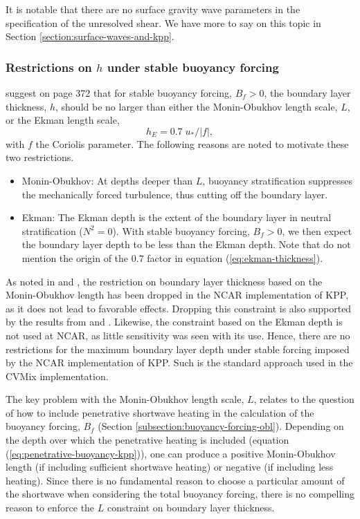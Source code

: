 It is notable that there are no surface gravity wave parameters in the
specification of the unresolved shear.  We have more to say on this
topic in Section \ref{section:surface-waves-and-kpp}. 


\subsubsection{Restrictions on $h$ under stable buoyancy forcing}

\cite{LargeKPP} suggest on page 372 that for stable buoyancy forcing,
$B_{f} > 0$, the boundary layer thickness, $h$, should be no larger
than either the Monin-Obukhov length scale, $L$, or the Ekman
length scale, 
\begin{equation}
 h_{E} = 0.7 \; u_{*} /|f|,
\label{eq:ekman-thickness}
\end{equation} 
with $f$ the Coriolis parameter.  The following reasons are noted to
motivate these two restrictions.
\begin{itemize}
\item {\sc Monin-Obukhov}: At depths deeper than $L$, buoyancy
  stratification suppresses the mechanically forced turbulence, thus
  cutting off the boundary layer.

  \item {\sc Ekman}: The Ekman depth is the extent of the boundary
    layer in neutral stratification ($N^{2} = 0$).  With stable
    buoyancy forcing, $B_{f} > 0$, we then expect the boundary layer
    depth to be less than the Ekman depth.  Note that \cite{LargeKPP}
    do not mention the origin of the $0.7$ factor in equation
    (\ref{eq:ekman-thickness}).

\end{itemize}

As noted in \cite{LargeKPP} and \cite{Large_Gent1999}, the restriction
on boundary layer thickness based on the Monin-Obukhov length has been
dropped in the NCAR implementation of KPP, as it does not lead to
favorable effects.  Dropping this constraint is also supported by the
results from \cite{Shchepetkin2005} and \cite{Lemarie_etal2012a}.
Likewise, the constraint based on the Ekman depth is not used at NCAR,
as little sensitivity was seen with its use.  Hence, there are no
restrictions for the maximum boundary layer depth under stable forcing
imposed by the NCAR implementation of KPP.  Such is the standard
approach used in the CVMix implementation.

The key problem with the Monin-Obukhov length scale, $L$, relates to
the question of how to include penetrative shortwave heating in the
calculation of the buoyancy forcing, $B_{f}$ (Section
\ref{subsection:buoyancy-forcing-obl}).  Depending on the depth over
which the penetrative heating is included (equation
(\ref{eq:penetrative-buoyancy-kpp})), one can produce a positive
Monin-Obukhov length (if including sufficient shortwave heating) or
negative (if including less heating). Since there is no fundamental
reason to choose a particular amount of the shortwave when considering
the total buoyancy forcing, there is no compelling reason to enforce
the $L$ constraint on boundary layer thickness.


